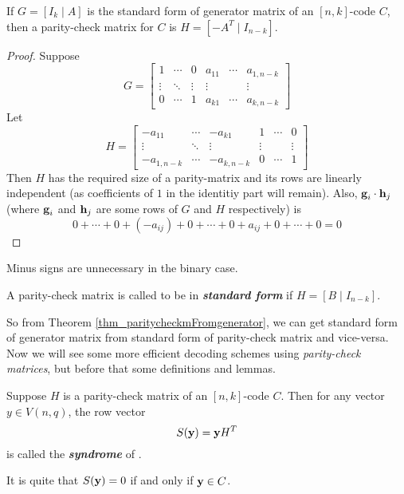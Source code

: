 \documentclass[../main.tex]{subfiles}
\begin{document}
\begin{thm}\label{thm_paritycheckmFromgenerator}
	If $G=[I_k \;|\; A]$ is the standard form of generator matrix of an $[n,k]$-code $C$, then a parity-check matrix for $C$ is $H=[-A^T \;|\; I_{n-k}]$.
\end{thm}
\begin{proof}
	Suppose
	\[
		G=	\left[
			\begin{array}{ccc|ccc}
			1 & \cdots  & 0 & a_{11} & \cdots & a_{1,n-k}\\
			\vdots & \ddots & \vdots & \vdots & & \vdots\\
			0 & \cdots & 1 & a_{k1} & \cdots & a_{k,n-k}
			\end{array}
			\right]
	\]
	Let
	\[
		H = \left[
			\begin{array}{ccc|ccc}
			-a_{11} & \cdots  & -a_{k1} & 1 & \cdots & 0\\
			\vdots & \ddots & \vdots & \vdots & & \vdots\\
			-a_{1,n-k} & \cdots & -a_{k,n-k} & 0 & \cdots & 1
			\end{array}
			\right]
	\]
	Then $H$ has the required size of a parity-matrix and its rows are linearly independent (as coefficients of $1$ in the identitiy part will remain). Also, $\textbf{g}_i\cdot \textbf{h}_j$ (where $\textbf{g}_i$ and $\textbf{h}_j$ are some rows of $G$ and $H$ respectively) is
	\[
		0+\cdots+0+(-a_{ij})+0+\cdots+0+a_{ij}+0+\cdots+0 = 0
	\]
\end{proof}
\begin{remark}
	Minus signs are unnecessary in the binary case.
\end{remark}

\begin{defn}
	A parity-check matrix is called to be in \textbf{\emph{standard form}} if $H=[B \;|\; I_{n-k}]$.
\end{defn}
So from Theorem \ref{thm_paritycheckmFromgenerator}, we can get standard form of generator matrix from standard form of parity-check matrix and vice-versa.\\

Now we will see some more efficient decoding schemes using \emph{parity-check matrices}, but before that some definitions and lemmas.

\begin{defn}
	Suppose $H$ is a parity-check matrix of an $[n,k]$-code $C$. Then for any vector $y\in V(n,q)$, the row vector
	\[
		S(\textbf{y})= \textbf{y}H^T
	\]
	is called the \textbf{\emph{syndrome}} of .
\end{defn}
It is quite that $S(\textbf{y})=0$ if and only if $\textbf{y}\in C$.
\end{document}
